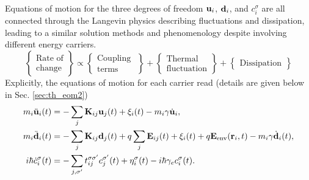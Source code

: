 Equations of motion for the three degrees of freedom $\mathbf{u}_i$, $\mathbf{d}_i$, and $c_i^{\sigma}$ are all connected through the Langevin physics describing fluctuations and dissipation, leading to a similar solution methods and phenomenology despite involving different energy carriers. 
\begin{equation}
 \left\{ \begin{array}{c}
          \textrm{Rate of} \\
	  \textrm{change} 
         \end{array}
\right\} \propto  \left\{ \begin{array}{c}
          \textrm{Coupling } \\
	  \textrm{terms} 
         \end{array}
\right\}+
\left\{ \begin{array}{c}
          \textrm{Thermal} \\
	  \textrm{fluctuation} 
         \end{array}
\right\}+
\left\{ \begin{array}{c}
          \textrm{Dissipation} %
         \end{array}
\right\}
\end{equation}
Explicitly, the equations of motion for each carrier read (details are given below in Sec. \ref{sec:th_eom2}) \cite{bolsterli70,rosa10,rosa11,dhar03}
\begin{subequations}
\begin{align}
 m_i \ddot{\mathbf{u}}_i(t) &=  - \sum_j \mathbf{K}_{ij}\mathbf{u}_j(t) + \xi_i(t) - m_i \gamma \dot{\mathbf{u}}_i, \label{eq:th_eom1} \\
 m_i \ddot{\mathbf{d}}_i(t) &= - \sum_j \mathbf{K}_{ij} \mathbf{d}_j(t) +q\sum_{j} \mathbf{E}_{ij}(t)+\xi_i(t)+ q\mathbf{E}_{\textrm{env}}(\mathbf{r}_i,t) - m_i \gamma \dot{\mathbf{d}}_i(t), \label{eq:th_eom2}\\
 i\hbar \dot{c}_i^{\sigma}(t) &= -\sum_{j,\sigma'} t_{ij}^{\sigma\sigma'} c_j^{\sigma'}(t) +\eta_i^{\sigma}(t) - i\hbar \gamma_e c_i^{\sigma}(t) \label{eq:th_eom3}.
\end{align}
\end{subequations}
